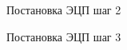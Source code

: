 \documentclass[10pt,a4paper]{report}
\begin{document}
\begin{figure}[h]
	\caption{Постановка ЭЦП шаг 2}
	\label{pic:pic4}
\end{figure}

\begin{figure}[h]
	\caption{Постановка ЭЦП шаг 3}
	\label{pic:pic5}
\end{figure}
\end{document}

